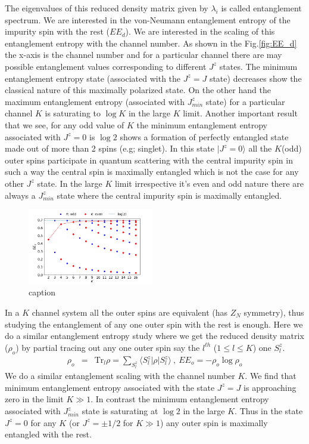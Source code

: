 \documentclass[reprint,prb,superscriptaddress]{revtex4-2}
\begin{document}
\noindent The eigenvalues of this reduced density matrix given by $\lambda_i$ is called entanglement spectrum. We are interested in the von-Neumann entanglement entropy of the impurity spin with the rest ($EE_d$). We are interested in the scaling of this entanglement entropy with the channel number. As shown in the Fig.\ref{fig:EE_d} the x-axis is the channel number and for a particular channel there are may possible entanglement values corresponding to different $J^z$ states. The minimum entanglement entropy state (associated with the $J^z=J$ state) decreases show the classical nature of this maximally polarized state. On the other hand the maximum entanglement entropy (associated with $J^z_{min}$ state) for a particular channel $K$ is saturating to $\log K$ in the large $K$ limit. Another important result that we see, for any odd value of $K$ the minimum entanglement entropy associated with $J^z=0$ is $\log 2$ shows a formation of perfectly entangled state made out of more than 2 spins (e.g; singlet). In this state $|J^z=0\rangle$ all the $K$(odd) outer spins participate in quantum scattering with the central impurity spin in such a way the central spin is maximally entangled which is not the case for any other $J^z$ state. In the large $K$ limit irrespective it's even and odd nature there are always a $J^z_{min}$ state where the central impurity spin is maximally entangled.
\begin{figure}[!htpb]
\centering
\includegraphics[width=0.49\textwidth]{plt/outer_EE_multi_channel_ANN.png}
\caption{caption}
\label{fig:EE_outer}
\end{figure}
In a $K$ channel system all the outer spins are equivalent (has $Z_N$ symmetry), thus studying the entanglement of any one outer spin with the rest is enough. Here we do a similar entanglement entropy study where we get the reduced density matrix ($\rho_o$) by partial tracing out any one outer spin say the $l^{th}$ ($1\leq l \leq K$) one $S^z_{l}$. 
\begin{eqnarray}
\rho_{o} &=& \textrm{Tr}_{l} \rho =\displaystyle\sum_{S^z_{l}} \langle S^z_l | \rho | S^z_{l} \rangle~,~EE_o=-\rho_{o}\log \rho_{o}
\end{eqnarray}
We do a similar entanglement scaling with the channel number $K$. We find that minimum entanglement entropy associated with the state $J^z=J$ is approaching zero in the limit $K\gg 1$. In contrast the minimum entanglement entropy associated with $J^z_{min}$ state is saturating at $\log 2$ in the large $K$. Thus in the state $J^z=0$ for any $K$ (or $J^z=\pm 1/2$ for $K\gg 1$) any outer spin is maximally entangled with the rest.
\end{document}
